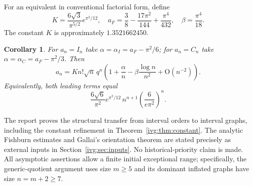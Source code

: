 \documentclass[11pt,letterpaper]{article}
\newtheorem{corollary}[theorem]{Corollary}
\theoremstyle{definition}\newtheorem{definition}[theorem]{Definition}
\theoremstyle{remark}\newtheorem{remark}[theorem]{Remark}
\newcommand{\OO}{\mathrm O}
\begin{document}
For an equivalent in conventional factorial form, define
\begin{equation}\label{ivg:eq:constants}
 K=\frac{6\sqrt3}{\pi^{5/2}}e^{\pi^2/12},\quad
 a_F=\frac38-\frac{17\pi^2}{144}+\frac{\pi^4}{432},\quad
 \beta=\frac{\pi^4}{18}.
\end{equation}
The constant $K$ is approximately $1.3521662450$.
\begin{corollary}\label{ivg:cor:normalized}
For $a_n=I_n$ take $\alpha=\alpha_I=a_F-\pi^2/6$; for $a_n=C_n$ take $\alpha=\alpha_C=a_F-\pi^2/3$. Then
\begin{equation}\label{ivg:eq:factorial}
 a_n=K n!\sqrt n\,q^n
 \left(1+\frac\alpha n-\beta\frac{\log n}{n^2}+\OO(n^{-2})\right).
\end{equation}
Equivalently, both leading terms equal
\[
 \frac{6\sqrt6}{\pi^2}e^{\pi^2/12}\,
 n^{n+1}\left(\frac{6}{e\pi^2}\right)^n.
\]
\end{corollary}
The report proves the structural transfer from interval orders to interval graphs, including the constant refinement in Theorem~\ref{ivg:thm:constant}. The analytic Fishburn estimates and Gallai's orientation theorem are stated precisely as external inputs in Section~\ref{ivg:sec:inputs}. No historical-priority claim is made. All asymptotic assertions allow a finite initial exceptional range; specifically, the generic-quotient argument uses size $m\ge5$ and its dominant inflated graphs have size $n=m+2\ge7$.
\end{document}
